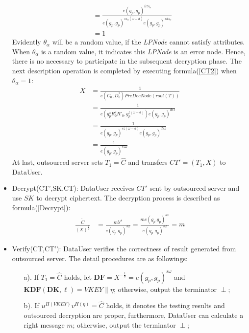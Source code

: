 \documentclass[smallextended]{svjour3}       %
\begin{document}
\begin{itemize}
\begin{equation}
\begin{split}
						  &=\frac{e(g_p,g_p)^{\bar{\omega}zs_\alpha}}{e(g_p,g_p)^{zs_\alpha (\bar{\omega}-d)} e(g_p,g_p)^{zds_\alpha}}\\
						  &=1
		\end{split}
	\end{equation}
Evidently $\theta_\alpha$ will be a random value, if the \textit{LPNode} cannot satisfy attributes. 
When $\theta_\alpha$ is a random value, it indicates this \textit{LPNode} is an error node. 
Hence, there is no necessary to participate in the subsequent decryption phase. 
The next description operation is completed by executing formula(\ref{CT2}) when $\theta_\alpha=1$:
\begin{equation}\label{CT2}
	\begin{split}
		X   &=\frac{1}{e(C_0,D_0^*)PreDecNode(root(T))}\\
			&=\frac{1}{e(g_p^sR_0^sR'_0,g_p^{z(\omega-d)})e(g_p,g_p)^{dsz}}\\
			&=\frac{1}{e(g_p,g_p)^{sz(\omega -d)}e(g_p,g_p)^{dsz}}\\
			&=\frac{1}{e(g_p,g_p)^{sz\omega}}
	\end{split}
\end{equation}
At last, outsourced server sets $T_1 = \widehat{C}$ and transfers $CT'=\left( T_1, X \right)$ to DataUser.
	\item Decrypt(CT',SK,CT): DataUser receives $CT'$ sent by outsourced server and use $SK$ to decrypt ciphertext. The decryption process is described as formula(\ref{Decrypt}):
	\begin{equation}\label{Decrypt}
		\begin{split}
			\frac{\tilde{C}}{(X)^\frac{1}{z}} &= \frac{mY^s}{e(g_p.g_p)^{s\omega}} 
												= \frac{me(g_p.g_p)^{s\omega}}{e(g_p.g_p)^{s\omega}} 
												= m
		\end{split}
	\end{equation}

	\item Verify(CT,CT'): DataUser verifies the correctness of result generated from outsourced server.
		  The detail procedures are as followings: 
		\begin{itemize}
			\item[a).] If $T_1=\widehat{C}$ holds, let $\textbf{DF}=X^{-\frac{1}{z}}=e(g_p,g_p)^{s \omega}$ and $\textbf{KDF}(\textbf{DK},\ell)=VKEY \parallel \eta$; otherwise, output the terminator $\perp$;
			\item[b).] If $u^{H(VKEY)}v^{H(\eta)}=\widehat{C}$ holds, it denotes the testing results and outsourced decryption are proper, furthermore, DataUser can calculate a right message $m$; otherwise, output the terminator $\perp$; 
		\end{itemize}
\end{itemize}
\end{document}
